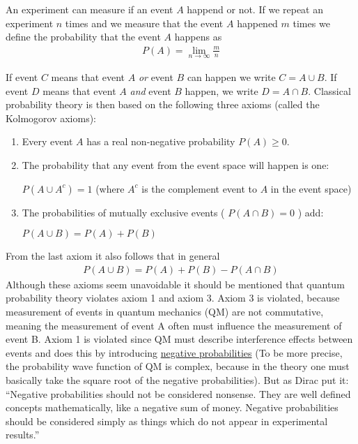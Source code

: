 An experiment can measure if an event $A$ happend or not. If we repeat
an experiment $n$ times and we measure that the event $A$ happened
$m$ times we define the probability that the event $A$ happens as
\begin{align}
P(A) = \lim\limits_{n \to \infty} \frac{m}{n}
\end{align}

If event $C$ means that event $A$ \emph{or} event $B$ can happen
we write $C = A \cup B$. If event $D$ means that event $A$
\emph{and} event $B$ happen, we write $D = A \cap B$. Classical
probability theory is then based on the following three axioms (called
the Kolmogorov axioms):

\begin{enumerate}
\item
  Every event $A$ has a real non-negative probability $P(A) \ge 0$.
\item
  The probability that any event from the event space will happen is
  one: 
  
  $P(A \cup A^c) = 1$ (where $A^c$ is the complement event to
  $A$ in the event space)
\item
  The probabilities of mutually exclusive events ( $P(A \cap B) = 0$ )
  add: 
  
  $P(A \cup B) = P(A) + P(B)$
\end{enumerate}

From the last axiom it also follows that in general
\begin{align}
P(A \cup B) = P(A) + P(B) - P(A \cap B)
\end{align}
Although these axioms seem unavoidable it should be mentioned that
quantum probability theory violates axiom 1 and axiom 3. Axiom 3 is
violated, because measurement of events in quantum mechanics (QM) are
not commutative, meaning the measurement of event A often must influence
the measurement of event B. Axiom 1 is violated since QM must describe
interference effects between events and does this by introducing
\href{https://en.wikipedia.org/wiki/Negative_probability}{negative
probabilities} (To be more precise, the probability wave function of QM
is complex, because in the theory one must basically take the square
root of the negative probabilities). But as Dirac put it: ``Negative
probabilities should not be considered nonsense. They are well defined
concepts mathematically, like a negative sum of money. Negative
probabilities should be considered simply as things which do not appear
in experimental results.''

